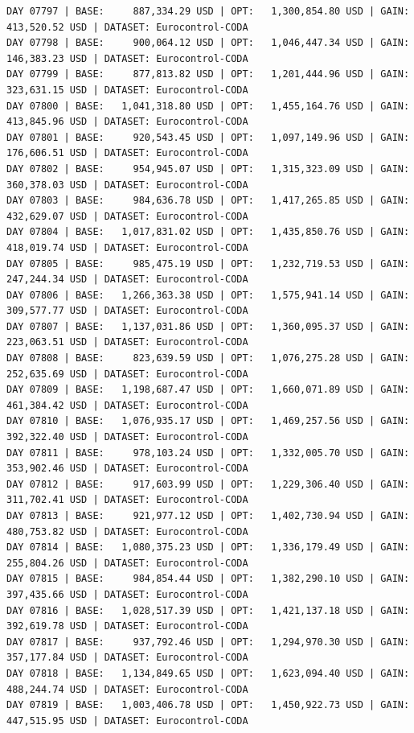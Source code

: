 \documentclass[11pt,a4paper]{article}
\begin{document}
\begin{verbatim}
DAY 07797 | BASE:     887,334.29 USD | OPT:   1,300,854.80 USD | GAIN: 413,520.52 USD | DATASET: Eurocontrol-CODA
DAY 07798 | BASE:     900,064.12 USD | OPT:   1,046,447.34 USD | GAIN: 146,383.23 USD | DATASET: Eurocontrol-CODA
DAY 07799 | BASE:     877,813.82 USD | OPT:   1,201,444.96 USD | GAIN: 323,631.15 USD | DATASET: Eurocontrol-CODA
DAY 07800 | BASE:   1,041,318.80 USD | OPT:   1,455,164.76 USD | GAIN: 413,845.96 USD | DATASET: Eurocontrol-CODA
DAY 07801 | BASE:     920,543.45 USD | OPT:   1,097,149.96 USD | GAIN: 176,606.51 USD | DATASET: Eurocontrol-CODA
DAY 07802 | BASE:     954,945.07 USD | OPT:   1,315,323.09 USD | GAIN: 360,378.03 USD | DATASET: Eurocontrol-CODA
DAY 07803 | BASE:     984,636.78 USD | OPT:   1,417,265.85 USD | GAIN: 432,629.07 USD | DATASET: Eurocontrol-CODA
DAY 07804 | BASE:   1,017,831.02 USD | OPT:   1,435,850.76 USD | GAIN: 418,019.74 USD | DATASET: Eurocontrol-CODA
DAY 07805 | BASE:     985,475.19 USD | OPT:   1,232,719.53 USD | GAIN: 247,244.34 USD | DATASET: Eurocontrol-CODA
DAY 07806 | BASE:   1,266,363.38 USD | OPT:   1,575,941.14 USD | GAIN: 309,577.77 USD | DATASET: Eurocontrol-CODA
DAY 07807 | BASE:   1,137,031.86 USD | OPT:   1,360,095.37 USD | GAIN: 223,063.51 USD | DATASET: Eurocontrol-CODA
DAY 07808 | BASE:     823,639.59 USD | OPT:   1,076,275.28 USD | GAIN: 252,635.69 USD | DATASET: Eurocontrol-CODA
DAY 07809 | BASE:   1,198,687.47 USD | OPT:   1,660,071.89 USD | GAIN: 461,384.42 USD | DATASET: Eurocontrol-CODA
DAY 07810 | BASE:   1,076,935.17 USD | OPT:   1,469,257.56 USD | GAIN: 392,322.40 USD | DATASET: Eurocontrol-CODA
DAY 07811 | BASE:     978,103.24 USD | OPT:   1,332,005.70 USD | GAIN: 353,902.46 USD | DATASET: Eurocontrol-CODA
DAY 07812 | BASE:     917,603.99 USD | OPT:   1,229,306.40 USD | GAIN: 311,702.41 USD | DATASET: Eurocontrol-CODA
DAY 07813 | BASE:     921,977.12 USD | OPT:   1,402,730.94 USD | GAIN: 480,753.82 USD | DATASET: Eurocontrol-CODA
DAY 07814 | BASE:   1,080,375.23 USD | OPT:   1,336,179.49 USD | GAIN: 255,804.26 USD | DATASET: Eurocontrol-CODA
DAY 07815 | BASE:     984,854.44 USD | OPT:   1,382,290.10 USD | GAIN: 397,435.66 USD | DATASET: Eurocontrol-CODA
DAY 07816 | BASE:   1,028,517.39 USD | OPT:   1,421,137.18 USD | GAIN: 392,619.78 USD | DATASET: Eurocontrol-CODA
DAY 07817 | BASE:     937,792.46 USD | OPT:   1,294,970.30 USD | GAIN: 357,177.84 USD | DATASET: Eurocontrol-CODA
DAY 07818 | BASE:   1,134,849.65 USD | OPT:   1,623,094.40 USD | GAIN: 488,244.74 USD | DATASET: Eurocontrol-CODA
DAY 07819 | BASE:   1,003,406.78 USD | OPT:   1,450,922.73 USD | GAIN: 447,515.95 USD | DATASET: Eurocontrol-CODA

\end{verbatim}
\end{document}
